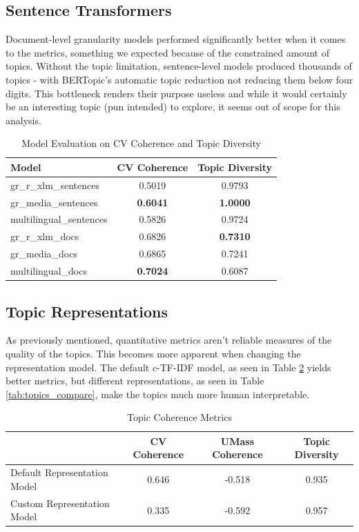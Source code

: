 \subsection{Sentence Transformers}
Document-level granularity models performed significantly better when it comes to the metrics, something we expected because of the constrained amount of topics. Without the topic limitation, sentence-level models produced thousands of topics - with BERTopic's automatic topic reduction not reducing them below four digits. This bottleneck renders their purpose useless and while it would certainly be an interesting topic (pun intended) to explore, it seems out of scope for this analysis.
\begin{table}[h]
    \centering
    \begin{tabular}{@{}lcc@{}}
        \toprule
        Model               & CV Coherence & Topic Diversity \\ 
        \midrule
        gr\_r\_xlm\_sentences       & 0.5019      & 0.9793          \\
        gr\_media\_sentences & \textbf{0.6041}      & \textbf{1.0000}       \\
        multilingual\_sentences & 0.5826  & 0.9724          \\
        gr\_r\_xlm\_docs            & 0.6826    & \textbf{0.7310}          \\
        gr\_media\_docs     &  0.6865    & 0.7241          \\
        multilingual\_docs   & \textbf{0.7024}     & 0.6087          \\
        \bottomrule
    \end{tabular}
    \caption{Model Evaluation on CV Coherence and Topic Diversity}
    \label{appB:st_eval}
\end{table}


\subsection{Topic Representations}
\label{sec:appendix_rep}
As previously mentioned, quantitative metrics aren't reliable measures of the quality of the topics. This becomes more apparent when changing the representation model. The default c-TF-IDF model, as seen in Table \ref{tab:coherence} yields better metrics, but different representations, as seen in Table \ref{tab:topics_compare}, make the topics much more human interpretable.


\begin{table}[h]
\centering
\begin{tabular}{lccc}
\toprule
 & CV Coherence  & UMass Coherence & Topic Diversity \\
\midrule
Default Representation Model & 0.646 & -0.518 & 0.935 \\
Custom Representation Model & 0.335 & -0.592 & 0.957 \\
\bottomrule
\end{tabular}
\caption{Topic Coherence Metrics}
\label{tab:coherence}
\end{table}

